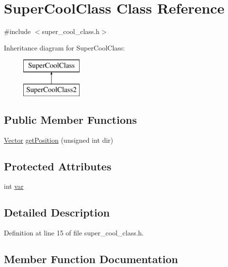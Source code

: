 \hypertarget{class_super_cool_class}{}\section{Super\+Cool\+Class Class Reference}
\label{class_super_cool_class}


{\ttfamily \#include $<$super\+\_\+cool\+\_\+class.\+h$>$}

Inheritance diagram for Super\+Cool\+Class\+:\begin{figure}[H]
\begin{center}
\leavevmode
\includegraphics[height=2.000000cm]{class_super_cool_class}
\end{center}
\end{figure}
\subsection*{Public Member Functions}
\begin{DoxyCompactItemize}
\item 
\mbox{\hyperlink{struct_vector}{Vector}} \mbox{\hyperlink{class_super_cool_class_a761c470f000de1a101a855de2d49d195}{get\+Position}} (unsigned int dir)
\end{DoxyCompactItemize}
\subsection*{Protected Attributes}
\begin{DoxyCompactItemize}
\item 
int \mbox{\hyperlink{class_super_cool_class_a0264bf7dc5bfe0057907102b2b5b767d}{var}}
\end{DoxyCompactItemize}


\subsection{Detailed Description}


Definition at line 15 of file super\+\_\+cool\+\_\+class.\+h.



\subsection{Member Function Documentation}
\mbox{\label{class_super_cool_class_a761c470f000de1a101a855de2d49d195}} 
